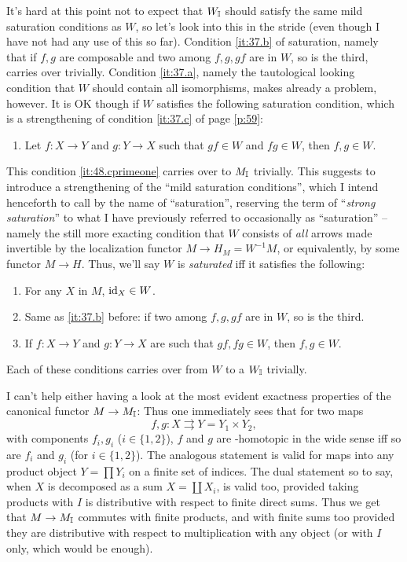 It's hard at this point not to expect that $W_{\mathbb{I}}$ should satisfy the
same mild saturation conditions as $W$, so let's look into this in the
stride (even though I have not had any use of this so far). Condition
\ref{it:37.b} of saturation, namely that if $f,g$ are composable and
two among $f,g,gf$ are in $W$, so is the third, carries over
trivially. Condition \ref{it:37.a}, namely the tautological looking
condition that $W$ should contain all isomorphisms, makes already a
problem, however. It is OK though if $W$ satisfies the following
saturation condition, which is a strengthening of condition
\ref{it:37.c} of page \ref{p:59}:
\begin{enumerate}[label=\alph*'),start=3]
\item\label{it:48.cprimeone}
  Let $f:X\to Y$ and $g:Y\to X$ such that $gf\in W$ and $fg\in W$,
  then $f,g\in W$.
\end{enumerate}
This condition \ref{it:48.cprimeone} carries over to $M_{\mathbb{I}}$
trivially. This suggests to introduce a strengthening of the ``mild
saturation conditions'', which I intend henceforth to call by the name
of ``saturation'', reserving the term of ``\emph{strong saturation}''
to what I have previously referred to occasionally as ``saturation''
-- namely the still more exacting condition that $W$ consists of
\emph{all} arrows made invertible by the localization functor $M\to
H_M=W^{-1}M$, or equivalently, by some functor $M\to H$. Thus, we'll
say $W$ is \emph{saturated} if{f} it satisfies the following:
\begin{enumerate}[label=\alph*')]
\item\label{it:48.aprime}
  For any $X$ in $M$, $\operatorname{id}_X\in W$.
\item\label{it:48.bprime}
  Same as \ref{it:37.b} before: if two among $f,g,gf$ are in $W$, so
  is the third.
\item\label{it:48.cprime}
  If $f:X\to Y$ and $g:Y\to X$ are such that $gf,fg\in W$, then
  $f,g\in W$.
\end{enumerate}
Each of these conditions carries over from $W$ to a $W_{\mathbb{I}}$ trivially.

I can't help either having a look at the most evident exactness
properties of the canonical functor $M\to M_{\mathbb{I}}$: Thus one immediately
sees that for two maps
\[f,g : X \rightrightarrows Y=Y_1\times Y_2,\]
with components $f_i,g_i$ ($i\in\{1,2\}$), $f$ and $g$ are
\bI-homotopic in the wide sense if{f} so are $f_i$ and $g_i$ (for
$i\in\{1,2\}$). The analogous statement is valid for maps into any
product object $Y=\prod Y_i$ on a finite set of indices. The
dual statement so to say, when $X$ is decomposed as a sum $X=\coprod
X_i$, is valid too, provided taking products with $I$ is distributive
with respect to finite direct sums. Thus we get that $M\to M_{\mathbb{I}}$
commutes with finite products, and with finite sums too provided they
are distributive with respect to multiplication with any object (or
with $I$ only, which would be enough).

